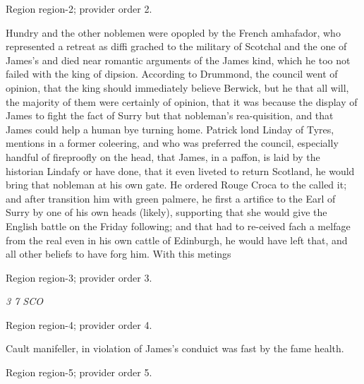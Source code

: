 \documentclass[11pt]{article}
\begin{document}
{\scriptsize\color{gray} Region region-2; provider order 2.\par}
\medskip

Hundry and the other noblemen were opopled by the French amhafador, who represented a retreat as diffi grached to the military of Scotchal and the one of James's and died near romantic arguments of the James kind, which he too not failed with the king of dipsion. According to Drummond, the council went of opinion, that the king should immediately believe Berwick, but he that all will, the majority of them were certainly of opinion, that it was because the display of James to fight the fact of Surry but that nobleman’s rea-quisition, and that James could help a human bye turning home. Patrick lond Linday of Tyres, mentions in a former coleering, and who was preferred the council, especially handful of fireproofly on the head, that James, in a paffon, is laid by the historian Lindafy or have done, that it even liveted to return Scotland, he would bring that nobleman at his own gate. He ordered Rouge Croca to the called it; and after transition him with green palmere, he first a artifice to the Earl of Surry by one of his own heads (likely), supporting that she would give the English battle on the Friday following; and that had to re-ceived fach a melfage from the real even in his own cattle of Edinburgh, he would have left that, and all other beliefs to have forg him. With this metings
\par

{\scriptsize\color{gray} Region region-3; provider order 3.\par}
\medskip

{\small\itshape 3 7 SCO\par}

{\scriptsize\color{gray} Region region-4; provider order 4.\par}
\medskip

Cault manifeller, in violation of James’s conduict was fast by the fame health.
\par

{\scriptsize\color{gray} Region region-5; provider order 5.\par}
\medskip
\end{document}
